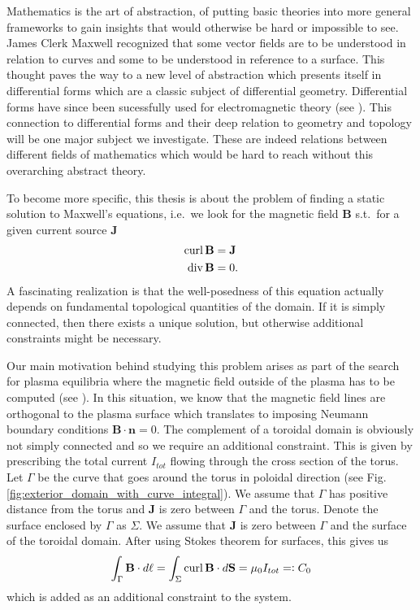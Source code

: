 \documentclass[../master_thesis.tex]{subfiles}
\begin{document}
Mathematics is the art of abstraction, of putting basic theories into more 
general frameworks to gain insights that would otherwise be hard or 
impossible to see. James Clerk Maxwell recognized that some
vector fields are to be understood in relation to curves 
and some to be understood in reference to a surface. 
This thought paves the way to a new level of abstraction
which presents itself in differential forms which are a classic 
subject of differential geometry. Differential forms have since been sucessfully
used for electromagnetic theory (see \cite{differential_forms_electromagnetism}).
This connection to differential forms and their deep relation to geometry and topology
will be one major subject we investigate. These are indeed relations between different 
fields of mathematics which would be hard to reach without this overarching abstract theory.

To become more specific, this thesis is about the problem of finding a static solution to Maxwell's equations,
i.e.~we look for the magnetic field $\mathbf{B}$ s.t.~for a given current source 
$\mathbf{J}$ 
\begin{align*}
    \operatorname{curl} \mathbf{B} &= \mathbf{J} 
    \\ \operatorname{div} \mathbf{B} &= 0.
\end{align*}
A fascinating realization is that the well-posedness of this equation actually 
depends on fundamental topological quantities of the domain. If it is simply 
connected, then there exists a unique solution, but otherwise additional constraints 
might be necessary.

Our main motivation behind studying this problem arises as part of the search for plasma equilibria where 
the magnetic field outside of the plasma has to be computed (see \cite{merkel1986}).
In this situation, we know that the magnetic field lines are orthogonal to the plasma surface
which translates to imposing Neumann boundary conditions 
$\mathbf{B} \cdot \mathbf{n} = 0$. The complement of a toroidal domain is obviously not simply connected and so 
we require an additional constraint. This is given by prescribing the total 
current  $I_{tot}$ flowing through the cross section of the torus.
Let $\Gamma$ be the curve that goes around the torus 
in poloidal direction (see Fig.\,\ref{fig:exterior_domain_with_curve_integral}). 
We assume that $\Gamma$ has positive distance from the torus and 
$\mathbf{J}$ is zero between $\Gamma$ and the torus.
Denote the surface enclosed by $\Gamma$ as $\Sigma$.
We assume that $\mathbf{J}$ is zero between $\Gamma$ and the surface of the toroidal domain.
After using Stokes theorem 
for surfaces, this gives us 
\begin{align*}
    \int_\Gamma \mathbf{B}\cdot d\ell= \int_\Sigma \operatorname{curl} \mathbf{B} \cdot d\mathbf{S} 
    = \mu_0 I_{tot} =\vcentcolon C_0
\end{align*}
which is added as an additional constraint to the system.
\end{document}
